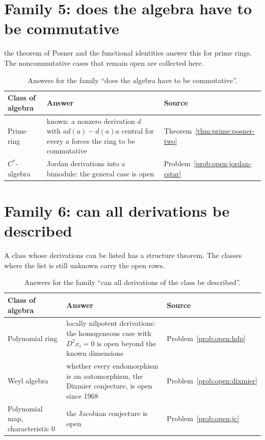 \section{Family 5: does the algebra have to be commutative}

the theorem of Posner and the functional identities answer this for prime rings.
The noncommutative cases that remain open are collected here.

\begin{table}[htbp]
  \centering
  \caption{Answers for the family ``does the algebra have to be
  commutative''.}
  \label{tab:q:commutative}
  \begin{tabular}{p{}p{}p{}}
    \toprule
    Class of algebra & Answer & Source \\
    \midrule
    Prime ring & known: a nonzero derivation $d$ with $ad(a)-d(a)a$ central
      for every $a$ forces the ring to be commutative &
      Theorem~\ref{thm:prime:posner-two} \\
    $C^{*}$-algebra & Jordan derivations into a bimodule: the general case is
      open & Problem~\ref{prob:open:jordan-cstar} \\
    \bottomrule
  \end{tabular}
\end{table}

\section{Family 6: can all derivations be described}

A class whose derivations can be listed has a structure theorem.
The classes where the list is still unknown carry the open rows.

\begin{table}[htbp]
  \centering
  \caption{Answers for the family ``can all derivations of the class be
  described''.}
  \label{tab:q:describe}
  \begin{tabular}{p{}p{}p{}}
    \toprule
    Class of algebra & Answer & Source \\
    \midrule
    Polynomial ring & locally nilpotent derivations: the homogeneous case
      with $D^2x_i=0$ is open beyond the known dimensions &
      Problem~\ref{prob:open:hdp} \\
    Weyl algebra & whether every endomorphism is an automorphism, the
      Dixmier conjecture, is open since 1968 &
      Problem~\ref{prob:open:dixmier} \\
    Polynomial map, characteristic $0$ & the Jacobian conjecture is open &
      Problem~\ref{prob:open:jc} \\
    \bottomrule
  \end{tabular}
\end{table}

